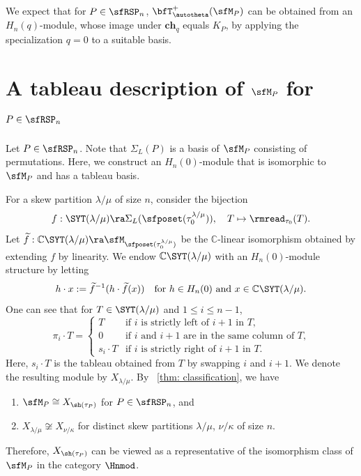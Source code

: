 \documentclass[12pt, reqno]{amsart}
\theoremstyle{definition}
\numberwithin{equation}{section} \numberwithin{figure}{section}
\numberwithin{table}{section}
\def\C{\mathbb C}
\begin{document}
We expect that for $P \in \sfRSP_n$, $\bfT^{+}_\autotheta(\sfM_P)$ can be obtained from an $H_n(q)$-module, whose image under $\textbf{ch}_q$ equals $K_P$, by applying the specialization $q = 0$ to a suitable basis.



\appendix

\section{A tableau description of $\sfM_P$ for $P \in \sfRSP_n$}\label{sec: appendix}

Let $P \in \sfRSP_n$.
Note that $\Sigma_L(P)$ is a basis of $\sfM_P$ consisting of permutations.
Here, we construct an $H_n(0)$-module that is isomorphic to $\sfM_P$ and has a tableau basis. 




For a skew partition $\lambda / \mu$ of size $n$,
consider the bijection 
$$f: \SYT(\lambda/\mu) \ra \Sigma_L(\sfposet(\tau_0^{\lambda/\mu})), \quad T \mapsto \rmread_{\tau_0}(T).
$$
Let $\widetilde{f}: \C\SYT(\lambda/\mu) \ra \sfM_{\sfposet(\tau_0^{\lambda/\mu})}$ be the $\C$-linear isomorphism obtained by extending $f$ by linearity.
We endow $\C\SYT(\lambda/\mu)$ with an $H_n(0)$-module structure by letting
\[
h \cdot x := \widetilde{f}^{-1}(h \cdot \widetilde{f}(x)) \quad \text{for $h \in H_n(0)$ and $x \in \C\SYT(\lambda/\mu)$}.
\] 
One can see that 
for $T \in \SYT(\lambda/\mu)$ and $1 \le i \le n-1$,
\[
\pi_i \cdot T =
\begin{cases}
T & \text{if $i$ is strictly left of $i+1$ in $T$,}\\
0 & \text{if $i$ and $i+1$ are in the same column of $T$,}\\
s_i \cdot T & \text{if $i$ is strictly right of $i + 1$ in $T$.}
\end{cases}
\]
Here, $s_i \cdot T$ is the tableau obtained from $T$ by swapping $i$ and $i+1$.
We denote the resulting module by $X_{\lambda/\mu}$.
By ~\cref{thm: classification}, we have
\begin{enumerate}[label = $\bullet$]
\item $\sfM_P \cong X_{\sh(\tau_P)}$ for $P \in \sfRSP_n$, and

\item $X_{\lambda/\mu} \not\cong X_{\nu/\kappa}$ for distinct skew partitions $\lambda/\mu$, $\nu/\kappa$ of size $n$.
\end{enumerate}
Therefore, $X_{\sh(\tau_P)}$ can be viewed as a representative of the isomorphism class of $\sfM_P$ in the category $\Hnmod$.
\end{document}
